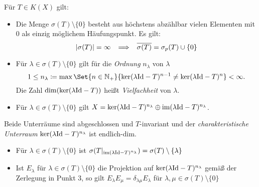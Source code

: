 \documentclass{cheat-sheet}
\begin{document}
\begin{satz}
  Für $T \in K(X)$ gilt:
  \begin{itemize}
    \item Die Menge $\sigma(T) \setminus \{ 0 \}$ besteht aus höchstens abzählbar vielen Elementen mit $0$ als einzig möglichem Häufungspunkt. Es gilt:
    \[
      \lvert\sigma(T)\rvert = \infty
      \enspace \implies \enspace
      \overline{\sigma(T)} = \sigma_p(T) \cup \{ 0 \}
    \]
    \item Für $\lambda \in \sigma(T) \setminus \{ 0 \}$ gilt für die \emph{Ordnung} $n_\lambda$ von $\lambda$
    \[ 1 \leq n_{\lambda} \coloneqq \max \Set{n \in \N_{+}}{ \ker(\lambda \Id - T)^{n-1} \not= \ker(\lambda \Id - T)^n } < \infty. \]
    Die Zahl $\dim (\ker (\lambda \mathrm{Id} - T))$ heißt \emph{Vielfachheit} von $\lambda$.
    \item Für $\lambda \in \sigma(T) \setminus \{ 0 \}$ gilt $X = \ker (\lambda \mathrm{Id} - T)^{n_\lambda} \oplus \mathop{\mathrm{im}} (\lambda \mathrm{Id} - T)^{n_\lambda}$.
  \end{itemize}
  Beide Unterräume sind abgeschlossen und $T$-invariant und der \emph{charakteristische Unterraum} $\ker (\lambda \mathrm{Id} - T)^{n_\lambda}$ ist endlich-dim.
  \begin{itemize}
    \item  Für $\lambda \in \sigma(T) \setminus \{ 0 \}$ ist $\sigma(T|_{\mathop{\mathrm{im}} (\lambda \mathrm{Id} - T)^{n_\lambda}}) = \sigma(T) \setminus \{ \lambda \}$
    \item Ist $E_\lambda$ für $\lambda \in \sigma(T) \setminus \{ 0 \}$ die Projektion auf $\ker (\lambda \mathrm{Id} - T)^{n_\lambda}$ gemäß der Zerlegung in Punkt 3, so gilt $E_\lambda E_\mu = \delta_{\lambda \mu} E_\lambda$ für $\lambda, \mu \in \sigma(T) \setminus \{ 0 \}$
  \end{itemize}
\end{satz}
\end{document}
